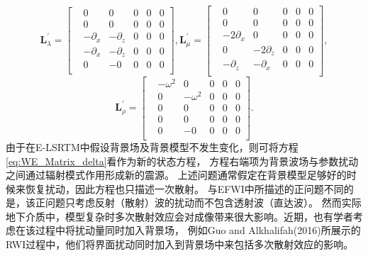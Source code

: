 \begin{equation}
        \mathbf{L}^{'}_{\lambda}=
        \begin{bmatrix}
			&0 &0 &0 & 0 &0\\
			& 0  &0 &0 &0 &0\\
			&-\partial_x &-\partial_z &0 &0&0\\
			& -\partial_x  &-\partial_z &0 &0&0\\
			& 0  &-0&0 &0&0\\
        \end{bmatrix},
        \mathbf{L}^{'}_{\mu}=
        \begin{bmatrix}
            &0 &0 &0 & 0 &0\\
            & 0  &0 &0 &0 &0\\
            &-2\partial_x &0 &0 &0&0\\
            & 0  &-2\partial_z &0 &0&0\\
            & -\partial_z  &-\partial_x&0 &0&0\\
        \end{bmatrix},
        \label{eq:L_lambdamu}
\end{equation}
\begin{equation}
        \mathbf{L}^{'}_{\rho}=
        \begin{bmatrix}
		&-\omega^2 &0 &0 & 0 &0\\
            & 0  &-\omega^2 &0 &0 &0\\
            &0&0 &0 &0&0\\
            &0  &0 &0 &0&0\\
            & 0  &-0&0 &0&0\\
        \end{bmatrix}.
        \label{eq:L_rho}
\end{equation}
由于在E-LSRTM中假设背景场及背景模型不发生变化，则可将方程\ref{eq:WE_Matrix_delta}看作为新的状态方程，
方程右端项为背景波场与参数扰动之间通过辐射模式作用形成新的震源。
上述问题通常假定在背景模型足够好的时候来恢复扰动，因此方程也只描述一次散射。
与EFWI中所描述的正问题不同的是，该正问题只考虑反射（散射）波的扰动而不包含透射波（直达波）。
然而实际地下介质中，模型复杂时多次散射效应会对成像带来很大影响。近期，也有学者考虑在该过程中将扰动量同时加入背景场，
例如Guo and
Alkhalifah(2016)\cite{Guo2016}所展示的RWI过程中，他们将界面扰动同时加入到背景场中来包括多次散射效应的影响。
